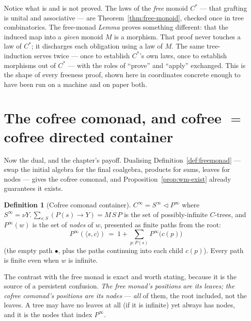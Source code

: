 \documentclass[11pt,a4paper]{book}
\newcommand{\cont}[2]{#1 \triangleleft #2}
\theoremstyle{plain}
\theoremstyle{definition}
\newtheorem{Definition}[Theorem]{Definition}
\theoremstyle{remark}
\begin{document}
\begin{teachbox}
Notice what is and is not proved. The laws of the \emph{free} monoid $C^{*}$ --- that grafting
is unital and associative --- are Theorem~\ref{thm:free-monoid}, checked once in tree
combinatorics. The free-monad \emph{Lemma} proves something different: that the induced map
into a \emph{given} monoid $M$ is a morphism. That proof never touches a law of $C^{*}$; it
discharges each obligation using a law of $M$. The same tree-induction serves twice --- once
to establish $C^{*}$'s own laws, once to establish morphisms out of $C^{*}$ --- with the roles
of ``prove'' and ``apply'' exchanged. This is the shape of every freeness proof, shown here in
coordinates concrete enough to have been run on a machine and on paper both.
\end{teachbox}

\section{The cofree comonad, and cofree $=$ cofree directed container}
\label{sec:moncomon-cofree}

Now the dual, and the chapter's payoff. Dualising Definition~\ref{def:freemonad} --- swap the
initial algebra for the final coalgebra, products for sums, leaves for nodes --- gives the
cofree comonad, and Proposition~\ref{prop:wm-exist} already guarantees it exists.

\begin{Definition}[Cofree comonad container]\label{def:cofreecomonad}
$C^{\infty}=\cont{S^{\infty}}{P^{\infty}}$ where
$S^{\infty}=\nu Y.\,\sum_{s:S}(P(s)\to Y)=M\,S\,P$ is the set of possibly-infinite
$C$-trees, and $P^{\infty}(w)$ is the set of \emph{nodes} of $w$, presented as finite paths
from the root:
\[
  P^{\infty}(\langle s,c\rangle)\ =\ 1+\textstyle\sum_{p:P(s)}P^{\infty}\!\bigl(c(p)\bigr)
\]
(the empty path $\bullet$, plus the paths continuing into each child $c(p)$). Every path is
finite even when $w$ is infinite.
\end{Definition}

The contrast with the free monad is exact and worth stating, because it is the source of a
persistent confusion. \emph{The free monad's positions are its leaves; the cofree comonad's
positions are its nodes} --- \emph{all} of them, the root included, not the leaves. A tree may
have no leaves at all (if it is infinite) yet always has nodes, and it is the nodes that index
$P^{\infty}$.
\end{document}
